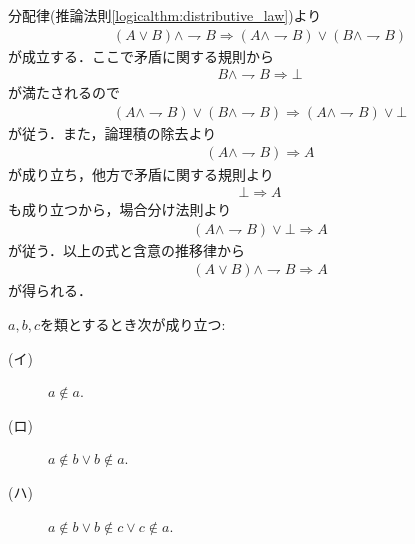 	\begin{prf}
		分配律(推論法則\ref{logicalthm:distributive_law})より
		\begin{align}
			(A \vee B) \wedge \rightharpoondown B
			\Longrightarrow (A \wedge \rightharpoondown B) \vee (B \wedge \rightharpoondown B)
		\end{align}
		が成立する．ここで矛盾に関する規則から
		\begin{align}
			B \wedge \rightharpoondown B \Longrightarrow \bot
		\end{align}
		が満たされるので
		\begin{align}
			(A \wedge \rightharpoondown B) \vee (B \wedge \rightharpoondown B)
			\Longrightarrow (A \wedge \rightharpoondown B) \vee \bot
		\end{align}
		が従う．また，論理積の除去より
		\begin{align}
			(A \wedge \rightharpoondown B) \Longrightarrow A
		\end{align}
		が成り立ち，他方で矛盾に関する規則より
		\begin{align}
			\bot \Longrightarrow A
		\end{align}
		も成り立つから，場合分け法則より
		\begin{align}
			(A \wedge \rightharpoondown B) \vee \bot \Longrightarrow A
		\end{align}
		が従う．以上の式と含意の推移律から
		\begin{align}
			(A \vee B) \wedge \rightharpoondown B \Longrightarrow A
		\end{align}
		が得られる．
		\QED
	\end{prf}
	
	\begin{screen}
		\begin{thm}[いかなる類も自分自身を要素に持たない]
		\label{thm:no_set_is_an_element_of_itself}
			$a,b,c$を類とするとき次が成り立つ:
			\begin{description}
				\item[(イ)] $a \notin a$.
				
				\item[(ロ)] $a \notin b \vee b \notin a$.
				
				\item[(ハ)] $a \notin b \vee b \notin c \vee c \notin a$.
			\end{description}
		\end{thm}
	\end{screen}
	
